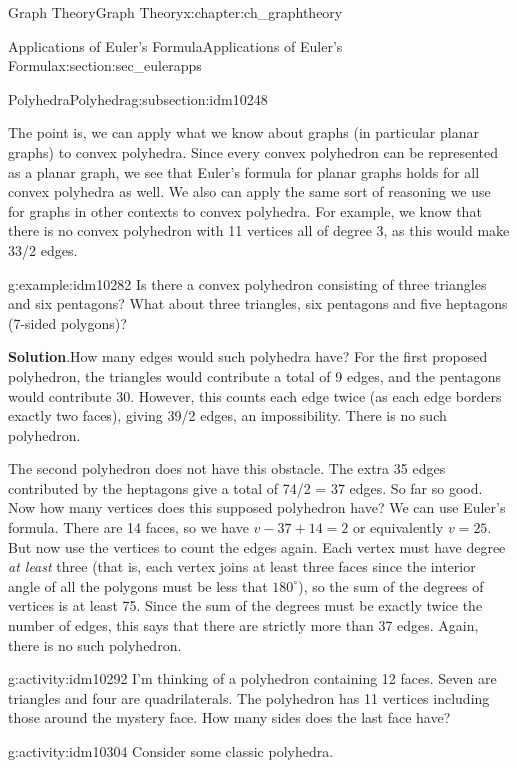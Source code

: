 \documentclass[oneside,10pt,]{book}
\numberwithin{equation}{chapter}
\begin{document}
\begin{chapterptx}{Graph Theory}{}{Graph Theory}{}{}{x:chapter:ch_graphtheory}
\begin{sectionptx}{Applications of Euler's Formula}{}{Applications of Euler's Formula}{}{}{x:section:sec_eulerapps}
\begin{subsectionptx}{Polyhedra}{}{Polyhedra}{}{}{g:subsection:idm10248}
\par
The point is, we can apply what we know about graphs (in particular planar graphs) to convex polyhedra. Since every convex polyhedron can be represented as a planar graph, we see that Euler's formula for planar graphs holds for all convex polyhedra as well. We also can apply the same sort of reasoning we use for graphs in other contexts to convex polyhedra. For example, we know that there is no convex polyhedron with 11 vertices all of degree 3, as this would make 33\slash{}2 edges.%
\begin{example}{}{g:example:idm10282}%
Is there a convex polyhedron consisting of three triangles and six pentagons? What about three triangles, six pentagons and five heptagons (7-sided polygons)?%
\par\smallskip%
\noindent\textbf{Solution}.\hypertarget{g:solution:idm10285}{}\quad{}How many edges would such polyhedra have? For the first proposed polyhedron, the triangles would contribute a total of 9 edges, and the pentagons would contribute 30. However, this counts each edge twice (as each edge borders exactly two faces), giving 39\slash{}2 edges, an impossibility. There is no such polyhedron.%
\par
The second polyhedron does not have this obstacle. The extra 35 edges contributed by the heptagons give a total of 74\slash{}2 = 37 edges. So far so good. Now how many vertices does this supposed polyhedron have? We can use Euler's formula. There are 14 faces, so we have \(v - 37 + 14 = 2\) or equivalently \(v = 25\). But now use the vertices to count the edges again. Each vertex must have degree \emph{at least} three (that is, each vertex joins at least three faces since the interior angle of all the polygons must be less that \(180^\circ\)), so the sum of the degrees of vertices is at least 75. Since the sum of the degrees must be exactly twice the number of edges, this says that there are strictly more than 37 edges. Again, there is no such polyhedron.%
\end{example}
\begin{activity}{}{g:activity:idm10292}%
I'm thinking of a polyhedron containing 12 faces. Seven are triangles and four are quadrilaterals. The polyhedron has 11 vertices including those around the mystery face. How many sides does the last face have?%
\end{activity}
\begin{activity}{}{g:activity:idm10304}%
Consider some classic polyhedra.%
\begin{enumerate}[font=\bfseries,label=(\alph*),ref=\alph*]

\end{enumerate}
\end{activity}
\end{subsectionptx}
\end{sectionptx}
\end{chapterptx}
\end{document}

